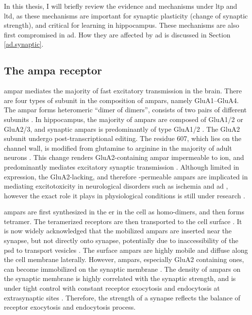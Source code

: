 In this thesis, I will briefly review the evidence and mechanisms under \gls{ltp} and \gls{ltd}, as these mechanisms are important for synaptic plasticity (change of synaptic strength), and critical for learning in hippocampus. These mechanisms are also first compromised in \gls{ad}. How they are affected by \gls{ad} is discussed in Section \ref{ad.synaptic}. 

\subsection{The \gls{ampa} receptor}

\gls{ampar} mediates the majority of fast excitatory transmission in the brain. There are four types of subunit in the composition of \glspl{ampar}, namely GluA1--GluA4. The \gls{ampar} forms heteromeric ``dimer of dimers'', consists of two pairs of different subunits \citep{ayalon01}. In hippocampus, the majority of \glspl{ampar} are composed of GluA1/2 or GluA2/3, and synaptic \glspl{ampar} is predominantly of type GluA1/2 \citep{wenthold96, lu09}. The GluA2 subunit undergo post-transcriptional editing. The residue 607, which lies on the channel wall, is modified from glutamine to arginine in the majority of adult neurons \citep{greger03}. This change renders GluA2-containing \gls{ampar} impermeable to  ion, and predominantly mediates excitatory synaptic transmission \citep{sommer91,swanson97}. Although limited in expression, the GluA2-lacking, and therefore -permeable \glspl{ampar} are implicated in mediating excitotoxicity in neurological disorders such as ischemia and \gls{ad} \citep{kwak06, whitehead17}, however the exact role it plays in physiological conditions is still under research \citep{whitehead17}.

\Glspl{ampar} are first synthesized in the \gls{er} in the cell as homo-dimers, and then forms tetramer. The teramerized receptors are then transported to the cell surface \citep{henley13}. It is now widely acknowledged that the mobilized \glspl{ampar} are inserted near the synapse, but not directly onto synapse, potentially due to inaccessibility of the \gls{psd} to transport vesicles \citep{henley11, chater14}. The surface \glspl{ampar} are highly mobile and diffuse along the cell membrane laterally. However, \glspl{ampar}, especially GluA2 containing ones, can become immobilized on the synaptic membrane \citep{borgdorff02, groc04}. The density of \glspl{ampar} on the synaptic membrane is highly correlated with the synaptic strength, and is under tight control with constant receptor exocytosis and endocytosis at extrasynaptic sites \citep{malinow02, henley11}. Therefore, the strength of a synapse reflects the balance of receptor exocytosis and endocytosis process. 

